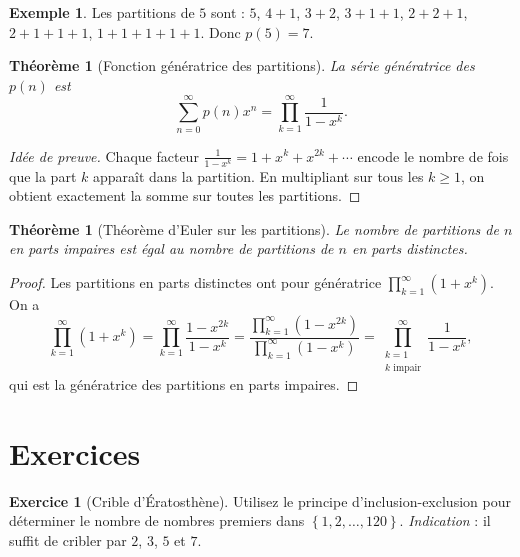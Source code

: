 \documentclass[12pt,a4paper,openany]{book}
\theoremstyle{definition}
\newtheorem{exemple}[definition]{Exemple}
\newtheorem{exercice}{Exercice}[chapter]
\theoremstyle{plain}
\newtheorem{theoreme}[definition]{Théorème}
\theoremstyle{remark}
\newcommand{\set}[1]{\left\{#1\right\}}
\begin{document}
\begin{exemple}
\label{ex:partitions-5}
Les partitions de $5$ sont : $5$, $4+1$, $3+2$, $3+1+1$, $2+2+1$,
$2+1+1+1$, $1+1+1+1+1$. Donc $p(5) = 7$.
\end{exemple}

\begin{theoreme}[Fonction génératrice des partitions]
\label{thm:partition-gen}
La série génératrice des $p(n)$ est
\[
  \sum_{n=0}^{\infty} p(n) x^n = \prod_{k=1}^{\infty} \frac{1}{1 - x^k}.
\]
\end{theoreme}

\begin{proof}[Idée de preuve]
Chaque facteur $\frac{1}{1-x^k} = 1 + x^k + x^{2k} + \cdots$ encode
le nombre de fois que la part $k$ apparaît dans la partition. En multipliant
sur tous les $k \geqslant 1$, on obtient exactement la somme sur toutes les partitions.
\end{proof}

\begin{theoreme}[Théorème d'Euler sur les partitions]
\label{thm:euler-partitions}
Le nombre de partitions de $n$ en parts impaires est égal au nombre de partitions
de $n$ en parts distinctes.
\end{theoreme}

\begin{proof}
Les partitions en parts distinctes ont pour génératrice
$\prod_{k=1}^\infty (1 + x^k)$. On a
\[
  \prod_{k=1}^{\infty}(1+x^k)
  = \prod_{k=1}^{\infty} \frac{1 - x^{2k}}{1-x^k}
  = \frac{\prod_{k=1}^{\infty}(1-x^{2k})}{\prod_{k=1}^{\infty}(1-x^k)}
  = \prod_{\substack{k=1 \\ k \text{ impair}}}^{\infty} \frac{1}{1-x^k},
\]
qui est la génératrice des partitions en parts impaires.
\end{proof}

\section{Exercices}
\label{sec:ie-exercices}

\begin{exercice}[Crible d'Ératosthène]
\label{exo:crible}
Utilisez le principe d'inclusion-exclusion pour déterminer le nombre
de nombres premiers dans $\set{1, 2, \dots, 120}$.
\emph{Indication} : il suffit de cribler par $2$, $3$, $5$ et $7$.
\end{exercice}
\end{document}
